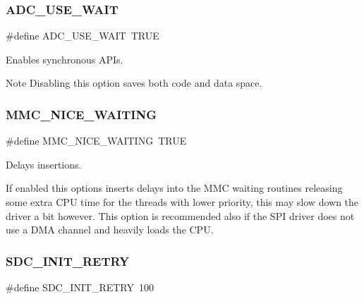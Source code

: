 \subsubsection{\texorpdfstring{A\+D\+C\+\_\+\+U\+S\+E\+\_\+\+W\+A\+IT}{ADC\_USE\_WAIT}}
{\footnotesize\ttfamily \#define A\+D\+C\+\_\+\+U\+S\+E\+\_\+\+W\+A\+IT~T\+R\+UE}



Enables synchronous A\+P\+Is. 

\begin{DoxyNote}{Note}
Disabling this option saves both code and data space. 
\end{DoxyNote}
\hypertarget{group__HAL__CONF_ga3087dfffa81dd8a0a80ee92746e65fe2}{}\label{group__HAL__CONF_ga3087dfffa81dd8a0a80ee92746e65fe2} 
\subsubsection{\texorpdfstring{M\+M\+C\+\_\+\+N\+I\+C\+E\+\_\+\+W\+A\+I\+T\+I\+NG}{MMC\_NICE\_WAITING}}
{\footnotesize\ttfamily \#define M\+M\+C\+\_\+\+N\+I\+C\+E\+\_\+\+W\+A\+I\+T\+I\+NG~T\+R\+UE}



Delays insertions. 

If enabled this options inserts delays into the M\+MC waiting routines releasing some extra C\+PU time for the threads with lower priority, this may slow down the driver a bit however. This option is recommended also if the S\+PI driver does not use a D\+MA channel and heavily loads the C\+PU. \hypertarget{group__HAL__CONF_ga8d39f0c9799062f0698d97c26e6fa42d}{}\label{group__HAL__CONF_ga8d39f0c9799062f0698d97c26e6fa42d} 
\subsubsection{\texorpdfstring{S\+D\+C\+\_\+\+I\+N\+I\+T\+\_\+\+R\+E\+T\+RY}{SDC\_INIT\_RETRY}}
{\footnotesize\ttfamily \#define S\+D\+C\+\_\+\+I\+N\+I\+T\+\_\+\+R\+E\+T\+RY~100}




